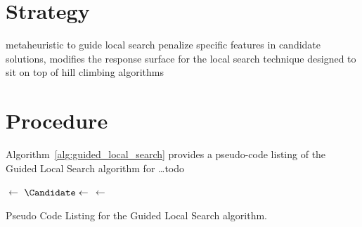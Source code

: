 \documentclass[a4paper, 11pt]{article}
\begin{document}
\section{Strategy}
\label{sec:strategy}
metaheuristic to guide local search
penalize specific features in candidate solutions, modifies the response surface for the local search technique
designed to sit on top of hill climbing algorithms


\section{Procedure}
\label{sec:procedure}
Algorithm~\ref{alg:guided_local_search} provides a pseudo-code listing of the Guided Local Search algorithm for \ldots todo

\begin{algorithm}[htp]
	\SetLine
	\KwIn{\NumIterations, \ProblemSize}
	\KwOut{\Current}
	\Current $\leftarrow$ \RandomSolution{\ProblemSize}\;
	 {
		$\Candidate \leftarrow$ \RandomNeighbor{\Current}\;		
		\If{\Cost{\Candidate} $\geq$ \Cost{\Current}} {
			\Current $\leftarrow$ \Candidate\;
		}
	}
	\Return{\Current}\;
	\caption{Pseudo Code Listing for the Guided Local Search algorithm.}
	\label{alg:guided_local_search}
\end{algorithm}
\end{document}
